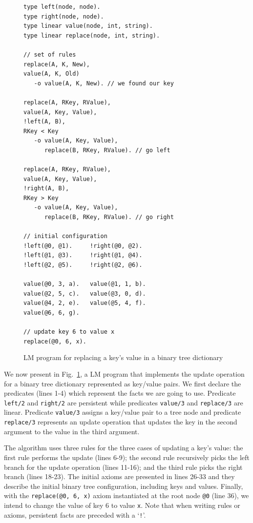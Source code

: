 \documentclass{sigplanconf}
\begin{document}
\begin{figure}[ht]
{\footnotesize
\begin{Verbatim}[numbers=right]
type left(node, node).
type right(node, node).
type linear value(node, int, string).
type linear replace(node, int, string).

// set of rules
replace(A, K, New),
value(A, K, Old)
   -o value(A, K, New). // we found our key

replace(A, RKey, RValue),
value(A, Key, Value),
!left(A, B),
RKey < Key
   -o value(A, Key, Value),
      replace(B, RKey, RValue). // go left

replace(A, RKey, RValue),
value(A, Key, Value),
!right(A, B),
RKey > Key
   -o value(A, Key, Value),
      replace(B, RKey, RValue). // go right

// initial configuration
!left(@0, @1).     !right(@0, @2).
!left(@1, @3).     !right(@1, @4). 
!left(@2, @5).     !right(@2, @6).

value(@0, 3, a).   value(@1, 1, b).
value(@2, 5, c).   value(@3, 0, d).
value(@4, 2, e).   value(@5, 4, f).
value(@6, 6, g).

// update key 6 to value x
replace(@0, 6, x).
\end{Verbatim}
}
\caption{LM program for replacing a key's value in a binary tree dictionary}
\label{code:btree_replace}
\end{figure}

We now present in Fig.~\ref{code:btree_replace}, a LM program that
implements the update operation for a binary tree dictionary
represented as key/value pairs. We first declare the predicates (lines
1-4) which represent the facts we are going to use. Predicate
\texttt{left/2} and \texttt{right/2} are persistent while predicates
\texttt{value/3} and \texttt{replace/3} are linear. Predicate
\texttt{value/3} assigns a key/value pair to a tree node and predicate
\texttt{replace/3} represents an update operation that updates the key
in the second argument to the value in the third argument.

The algorithm uses three rules for the three cases of updating a key's
value: the first rule performs the update (lines 6-9); the second rule
recursively picks the left branch for the update operation (lines
11-16); and the third rule picks the right branch (lines 18-23). The
initial axioms are presented in lines 26-33 and they describe the
initial binary tree configuration, including keys and values.
Finally, with the \texttt{replace(@0, 6, x)} axiom instantiated at the
root node \texttt{@0} (line 36), we intend to change the value of key
6 to value \texttt{x}. Note that when writing rules or axioms,
persistent facts are preceded with a `\texttt{!}'.
\end{document}

